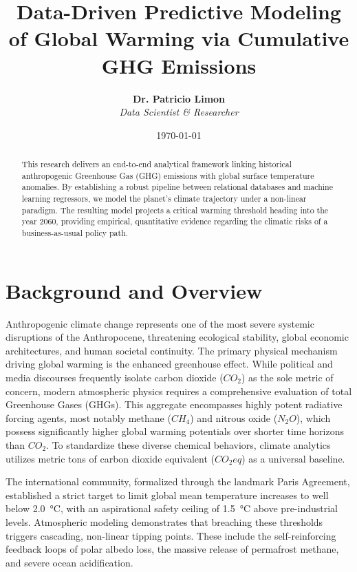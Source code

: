 \documentclass[11pt,letterpaper]{article}
\title{\textbf{Data-Driven Predictive Modeling of Global Warming via Cumulative GHG Emissions}}
\author{\textbf{Dr. Patricio Limon} \\ \textit{Data Scientist \& Researcher}}
\date{\today}
\begin{document}
	
	\maketitle
	
	\begin{abstract}
		This research delivers an end-to-end analytical framework linking historical anthropogenic Greenhouse Gas (GHG) emissions with global surface temperature anomalies. By establishing a robust pipeline between relational databases and machine learning regressors, we model the planet's climate trajectory under a non-linear paradigm. The resulting model projects a critical warming threshold heading into the year 2060, providing empirical, quantitative evidence regarding the climatic risks of a business-as-usual policy path.
	\end{abstract}
	
	\section{Background and Overview}
	
	Anthropogenic climate change represents one of the most severe systemic disruptions of the Anthropocene, threatening ecological stability, global economic architectures, and human societal continuity. The primary physical mechanism driving global warming is the enhanced greenhouse effect. While political and media discourses frequently isolate carbon dioxide ($CO_2$) as the sole metric of concern, modern atmospheric physics requires a comprehensive evaluation of total Greenhouse Gases (GHGs). This aggregate encompasses highly potent radiative forcing agents, most notably methane ($CH_4$) and nitrous oxide ($N_2O$), which possess significantly higher global warming potentials over shorter time horizons than $CO_2$. To standardize these diverse chemical behaviors, climate analytics utilizes metric tons of carbon dioxide equivalent ($CO_2eq$) as a universal baseline.
	
	The international community, formalized through the landmark Paris Agreement, established a strict target to limit global mean temperature increases to well below 2.0~°C, with an aspirational safety ceiling of 1.5~°C above pre-industrial levels. Atmospheric modeling demonstrates that breaching these thresholds triggers cascading, non-linear tipping points. These include the self-reinforcing feedback loops of polar albedo loss, the massive release of permafrost methane, and severe ocean acidification. 
	
\end{document}
